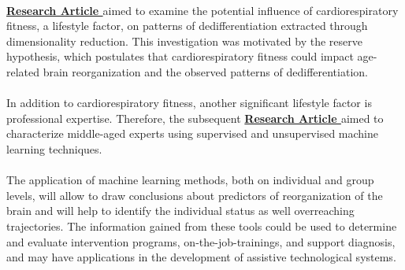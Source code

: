 \\
\textbf{\hyperref[paperIII]{Research Article }} aimed to examine the potential influence of cardiorespiratory fitness, a lifestyle factor, on patterns of dedifferentiation extracted through dimensionality reduction. This investigation was motivated by the reserve hypothesis, which postulates that cardiorespiratory fitness could impact age-related brain reorganization and the observed patterns of dedifferentiation.\\
\\
In addition to cardiorespiratory fitness, another significant lifestyle factor is professional expertise. Therefore, the subsequent \textbf{\hyperref[paperIV]{Research Article }} aimed to characterize middle-aged experts using supervised and unsupervised machine learning techniques.\\
\\
The application of machine learning methods, both on individual and group levels, will allow to draw conclusions about predictors of reorganization of the brain and will help to identify the individual status as well overreaching trajectories. The information gained from these tools could be used to determine and evaluate intervention programs, on-the-job-trainings, and support diagnosis, and may have applications in the development of assistive technological systems. 